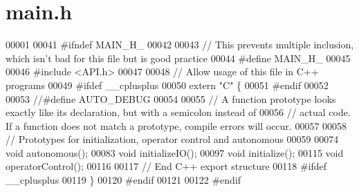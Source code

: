 \section{main.\+h}
\label{main_8h_source}

\begin{DoxyCode}
00001 
00041 \textcolor{preprocessor}{#ifndef MAIN\_H\_}
00042 
00043 \textcolor{comment}{// This prevents multiple inclusion, which isn't bad for this file but is good practice}
00044 \textcolor{preprocessor}{#define MAIN\_H\_}
00045 
00046 \textcolor{preprocessor}{#include <API.h>}
00047 
00048 \textcolor{comment}{// Allow usage of this file in C++ programs}
00049 \textcolor{preprocessor}{#ifdef \_\_cplusplus}
00050 \textcolor{keyword}{extern} \textcolor{stringliteral}{"C"} \{
00051 \textcolor{preprocessor}{#endif}
00052 
00053 \textcolor{comment}{//#define AUTO\_DEBUG}
00054 
00055 \textcolor{comment}{// A function prototype looks exactly like its declaration, but with a semicolon instead of}
00056 \textcolor{comment}{// actual code. If a function does not match a prototype, compile errors will occur.}
00057 
00058 \textcolor{comment}{// Prototypes for initialization, operator control and autonomous}
00059 
00074 \textcolor{keywordtype}{void} autonomous();
00083 \textcolor{keywordtype}{void} initializeIO();
00097 \textcolor{keywordtype}{void} initialize();
00115 \textcolor{keywordtype}{void} operatorControl();
00116 
00117 \textcolor{comment}{// End C++ export structure}
00118 \textcolor{preprocessor}{#ifdef \_\_cplusplus}
00119 \}
00120 \textcolor{preprocessor}{#endif}
00121 
00122 \textcolor{preprocessor}{#endif}
\end{DoxyCode}
